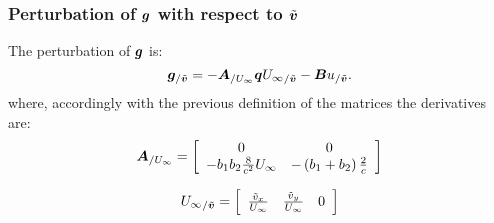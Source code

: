 \subsubsection{Perturbation of $\bm{g}$ with respect to $\tilde{\bm{v}}$}
The perturbation of $\bm{g}$ is:
\begin{equation}\label{eq:g_v_2}
\bm{g}_{/\tilde{\bm{v}}} = 
	- \bm{A}_{/U_\infty} \bm{q} 
	{U_\infty}_{/\tilde{\bm{v}}}
	-\bm{B} u_{/\tilde{\bm{v}}}.
\end{equation}
where, accordingly with the previous definition of the matrices the derivatives are:
\begin{equation}
\bm{A}_{/U_\infty} = \left[
	\begin{array}{cccccc}
	0 & 0\\
	-b_1 b_2 \frac{8}{c^2} U_\infty & -\left( b_1 + b_2 \right) \frac{2}{c}
	\end{array}
	\right]
\end{equation}
	
\begin{equation}
	{U_\infty}_{/\tilde{\bm{v}}} = \left[
	\begin{array}{ccc}
		\frac{\tilde{v}_x}{U_\infty} &
		\frac{\tilde{v}_y}{U_\infty} &
		0
	\end{array}
	\right]
\end{equation}

